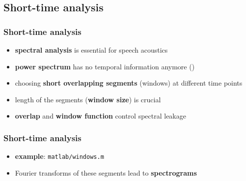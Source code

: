
\subsection{Short-time analysis}

\begin{frame} %
	\frametitle{Short-time analysis}
	\begin{itemize}
		\item \textbf{spectral analysis} is essential for speech acoustics
		\item \textbf{power spectrum} has no temporal information anymore ()
			\begin{figure}
				\centering
				\begin{subfigure}[c]{0.48\linewidth}
				\end{subfigure}
				\hspace{0.01\linewidth}
				\begin{subfigure}[c]{0.48\linewidth}
				\end{subfigure}
			\end{figure}
		\item choosing \textbf{short overlapping segments} (windows) at different time points
		\item length of the segments (\textbf{window size}) is crucial
		\item \textbf{overlap} and \textbf{window function} control spectral leakage
	\end{itemize}
\end{frame}

\begin{frame} %
	\frametitle{Short-time analysis}
	\begin{itemize}
		\item \textbf{example}: \texttt{matlab/windows.m}
			\begin{figure}
				\centering
				\begin{subfigure}[c]{0.8\linewidth}
				\end{subfigure}
			\end{figure}
		\item Fourier transforms of these segments lead to \textbf{spectrograms}
	\end{itemize}
\end{frame}

